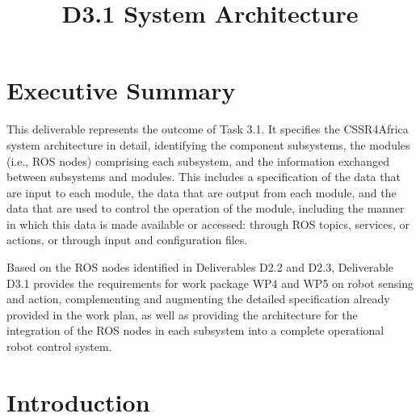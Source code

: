 \documentclass{CSSRforAfrica}
\begin{document}



\title{D3.1 System Architecture}  





\maketitle
 

\section*{Executive Summary}
\label{executive_summary}
 
This deliverable represents the outcome of Task 3.1.  It specifies the CSSR4Africa system architecture in detail, identifying the component subsystems, the modules (i.e., ROS nodes) comprising each subsystem, and the information exchanged between subsystems and modules. This includes a specification of the data that are input to each module, the data that are output from each module, and the data that are used to control the operation of the module, including the manner in which this data is made available or accessed: through ROS topics, services, or actions, or through input and configuration files.

Based on the ROS nodes identified in  Deliverables D2.2 and D2.3, Deliverable D3.1 provides the requirements for work package WP4 and WP5 on robot  sensing and action, complementing and augmenting the detailed specification already provided in the work plan, as well as providing the architecture for the integration of the ROS nodes in each subsystem into a complete operational robot control system. 

\newpage
 
 
\pagebreak
\tableofcontents
\newpage

\section{Introduction}
\end{document}

